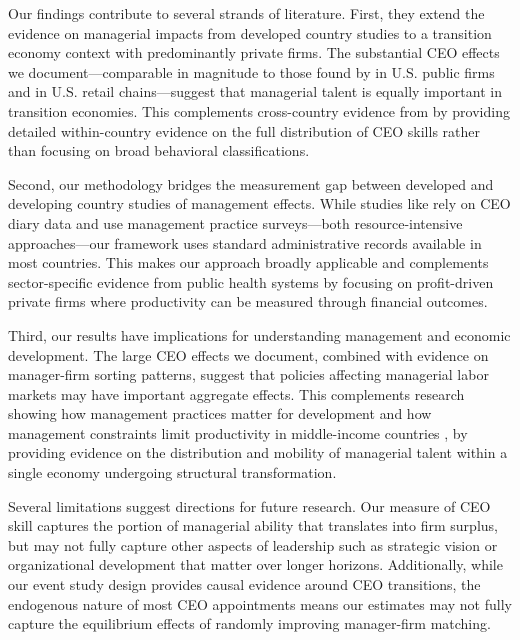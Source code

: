 \documentclass[11pt,a4paper]{article}
\begin{document}
Our findings contribute to several strands of literature. First, they extend the evidence on managerial impacts from developed country studies to a transition economy context with predominantly private firms. The substantial CEO effects we document—comparable in magnitude to those found by \citet{Bertrand2003-io} in U.S. public firms and \citet{metcalfe2023managers} in U.S. retail chains—suggest that managerial talent is equally important in transition economies. This complements cross-country evidence from \citet{dahlstrand2025ceo} by providing detailed within-country evidence on the full distribution of CEO skills rather than focusing on broad behavioral classifications.

Second, our methodology bridges the measurement gap between developed and developing country studies of management effects. While studies like \citet{bandiera2020ceo} rely on CEO diary data and \citet{bloom2013does} use management practice surveys—both resource-intensive approaches—our framework uses standard administrative records available in most countries. This makes our approach broadly applicable and complements sector-specific evidence from public health systems \citep{janke2024role, munoz2024leadership} by focusing on profit-driven private firms where productivity can be measured through financial outcomes.

Third, our results have implications for understanding management and economic development. The large CEO effects we document, combined with evidence on manager-firm sorting patterns, suggest that policies affecting managerial labor markets may have important aggregate effects. This complements research showing how management practices matter for development \citep{bloom2013does} and how management constraints limit productivity in middle-income countries \citep{dahlstrand2025ceo}, by providing evidence on the distribution and mobility of managerial talent within a single economy undergoing structural transformation.

Several limitations suggest directions for future research. Our measure of CEO skill captures the portion of managerial ability that translates into firm surplus, but may not fully capture other aspects of leadership such as strategic vision or organizational development that matter over longer horizons. Additionally, while our event study design provides causal evidence around CEO transitions, the endogenous nature of most CEO appointments means our estimates may not fully capture the equilibrium effects of randomly improving manager-firm matching.
\end{document}
